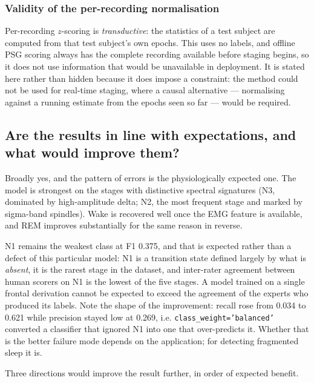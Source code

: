 \documentclass[11pt,a4paper]{article}
\newcommand{\num}[1]{#1}
\begin{document}
\subsubsection{Validity of the per-recording normalisation}

Per-recording $z$-scoring is \emph{transductive}: the statistics of a test subject are computed
from that test subject's own epochs. This uses no labels, and offline PSG scoring always has the
complete recording available before staging begins, so it does not use information that would be
unavailable in deployment. It is stated here rather than hidden because it does impose a
constraint: the method could not be used for real-time staging, where a causal alternative ---
normalising against a running estimate from the epochs seen so far --- would be required.

\subsection{Are the results in line with expectations, and what would improve them?}

Broadly yes, and the pattern of errors is the physiologically expected one. The model is
strongest on the stages with distinctive spectral signatures (N3, dominated by high-amplitude
delta; N2, the most frequent stage and marked by sigma-band spindles). Wake is recovered well
once the EMG feature is available, and REM improves substantially for the same reason in
reverse.

N1 remains the weakest class at F1 \num{0.375}, and that is expected rather than a defect of
this particular model: N1 is a transition state defined largely by what is \emph{absent}, it is
the rarest stage in the dataset, and inter-rater agreement between human scorers on N1 is the
lowest of the five stages. A model trained on a single frontal derivation cannot be expected to
exceed the agreement of the experts who produced its labels. Note the shape of the improvement:
recall rose from \num{0.034} to \num{0.621} while precision stayed low at \num{0.269}, i.e.
\texttt{class\_weight='balanced'} converted a classifier that ignored N1 into one that
over-predicts it. Whether that is the better failure mode depends on the application; for
detecting fragmented sleep it is.

Three directions would improve the result further, in order of expected benefit.
\end{document}
